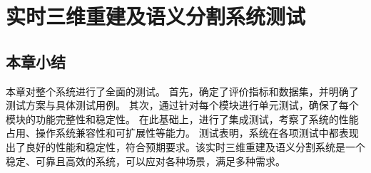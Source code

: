 
\chapter{实时三维重建及语义分割系统测试}





\section{本章小结}
\par 本章对整个系统进行了全面的测试。
首先，确定了评价指标和数据集，并明确了测试方案与具体测试用例。
其次，通过针对每个模块进行单元测试，确保了每个模块的功能完整性和稳定性。
在此基础上，进行了集成测试，考察了系统的性能占用、操作系统兼容性和可扩展性等能力。
测试表明，系统在各项测试中都表现出了良好的性能和稳定性，符合预期要求。该实时三维重建及语义分割系统是一个稳定、可靠且高效的系统，可以应对各种场景，满足多种需求。